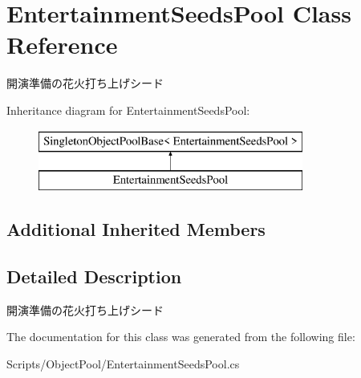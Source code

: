 \hypertarget{class_entertainment_seeds_pool}{}\section{Entertainment\+Seeds\+Pool Class Reference}
\label{class_entertainment_seeds_pool}


開演準備の花火打ち上げシード  


Inheritance diagram for Entertainment\+Seeds\+Pool\+:\begin{figure}[H]
\begin{center}
\leavevmode
\includegraphics[height=2.000000cm]{class_entertainment_seeds_pool}
\end{center}
\end{figure}
\subsection*{Additional Inherited Members}


\subsection{Detailed Description}
開演準備の花火打ち上げシード 



The documentation for this class was generated from the following file\+:\begin{DoxyCompactItemize}
\item 
Scripts/\+Object\+Pool/Entertainment\+Seeds\+Pool.\+cs\end{DoxyCompactItemize}
